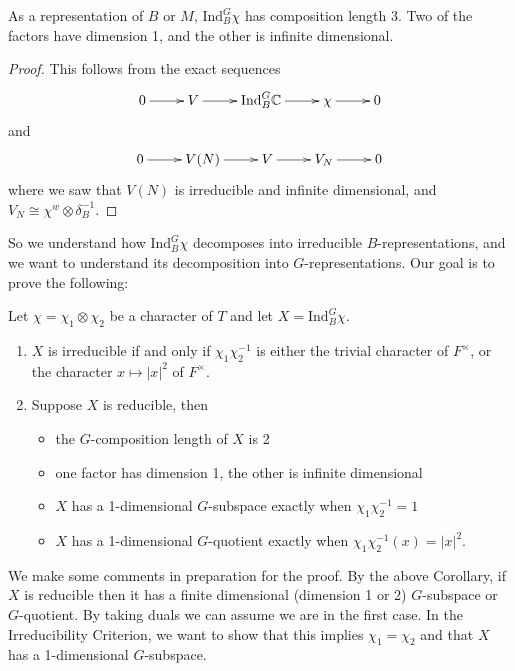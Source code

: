 \begin{cor}
    As a representation of $B$ or $M$, $\mathrm{Ind}_B^G \chi$ has composition length 3. Two of the factors have dimension 1, and the other is infinite dimensional.
\end{cor}
\begin{proof}
    This follows from the exact sequences
    $$\xymatrix{0 \ar[r] & V \ar[r] & \mathrm{Ind}_B^G \CC \ar[r] & \chi \ar[r] & 0}$$
    and
    $$\xymatrix{0 \ar[r] & V(N) \ar[r] & V \ar[r] & V_N \ar[r] & 0}$$
    where we saw that $V(N)$ is irreducible and infinite dimensional, and $V_N \cong \chi^w \otimes \delta_B^{-1}$.
\end{proof}

So we understand how $\mathrm{Ind}_B^G \chi$ decomposes into irreducible $B$-representations, and we want to understand its decomposition into $G$-representations. Our goal is to prove the following:

\begin{thm}\label{criterion}
    Let $\chi = \chi_1 \otimes \chi_2$ be a character of $T$ and let $X = \mathrm{Ind}_B^G \chi$.
    \begin{enumerate}
        \item $X$ is irreducible if and only if $\chi_1\chi_2^{-1}$ is either the trivial character of $F^\times$, or the character $x \mapsto |x|^2$ of $F^\times$.
        \item Suppose $X$ is reducible, then \begin{itemize}
            \item the $G$-composition length of $X$ is 2
            \item one factor has dimension 1, the other is infinite dimensional
            \item $X$ has a 1-dimensional $G$-subspace exactly when $\chi_1\chi_2^{-1}=1$
            \item $X$ has a 1-dimensional $G$-quotient exactly when $\chi_1\chi_2^{-1}(x) = |x|^2$.
        \end{itemize}
    \end{enumerate}
\end{thm}

We make some comments in preparation for the proof. By the above Corollary, if $X$ is reducible then it has a finite dimensional (dimension 1 or 2) $G$-subspace or $G$-quotient. By taking duals we can assume we are in the first case. In the Irreducibility Criterion, we want to show that this implies $\chi_1 = \chi_2$ and that $X$ has a 1-dimensional $G$-subspace.

